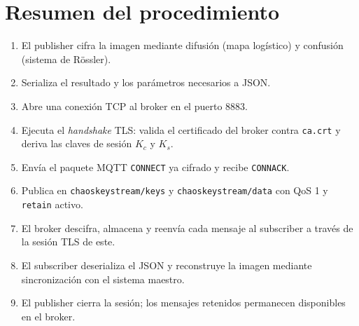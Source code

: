 \documentclass[12pt,a4paper]{article}
\newcommand{\Kc}{K_{c}}
\newcommand{\Ks}{K_{s}}
\begin{document}
\section{Resumen del procedimiento}

\begin{enumerate}[leftmargin=1.4cm, itemsep=0.3em]
	\item El publisher cifra la imagen mediante difusión (mapa logístico) y confusión (sistema de Rössler).
	\item Serializa el resultado y los parámetros necesarios a JSON.
	\item Abre una conexión TCP al broker en el puerto 8883.
	\item Ejecuta el \textit{handshake} TLS: valida el certificado del broker contra \texttt{ca.crt} y deriva las claves de sesión $\Kc$ y $\Ks$.
	\item Envía el paquete MQTT \texttt{CONNECT} ya cifrado y recibe \texttt{CONNACK}.
	\item Publica en \texttt{chaoskeystream/keys} y \texttt{chaoskeystream/data} con QoS 1 y \texttt{retain} activo.
	\item El broker descifra, almacena y reenvía cada mensaje al subscriber a través de la sesión TLS de este.
	\item El subscriber deserializa el JSON y reconstruye la imagen mediante sincronización con el sistema maestro.
	\item El publisher cierra la sesión; los mensajes retenidos permanecen disponibles en el broker.
\end{enumerate}
\end{document}
